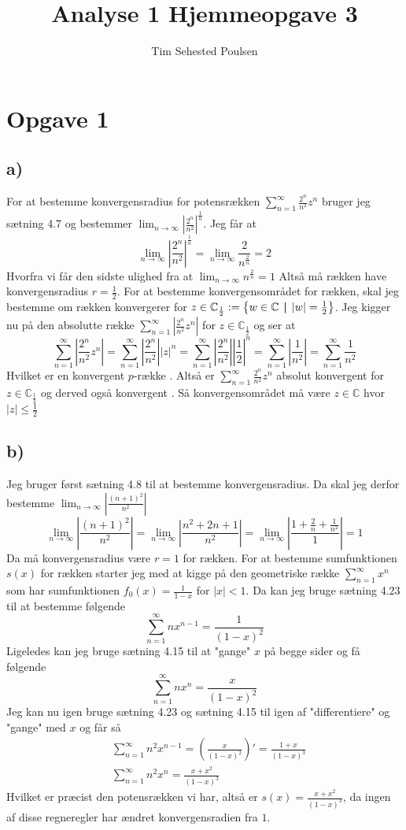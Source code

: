 \documentclass{article}
\title{Analyse 1 Hjemmeopgave 3}
\author{Tim Sehested Poulsen}
\newcommand{\m}[1]{\mathbb{#1}}
\newcommand{\mC}{\m{C}}
\newcommand{\lr}[1]{\left( #1\right)}
\newcommand{\set}[2]{\left\{ #1 \hspace{0.15cm} \textbf{\textbar}  \hspace{0.15cm} #2 \right\} }
\begin{document}
\section*{Opgave 1}
\subsection*{a)}
For at bestemme konvergensradius for potensrækken $\sum_{n=1}^{\infty} \frac{2^n}{n^2} z^n$ bruger jeg sætning 4.7 \cite{an1} og bestemmer
$\lim_{n \to \infty} |\frac{2^n}{n^2}|^{\frac{1}{n}}$. Jeg får at
\[
    \lim_{n \to \infty} |\frac{2^n}{n^2}|^{\frac{1}{n}}
    = \lim_{n \to \infty} \frac{2}{n^{\frac{2}{n}}}
    = 2
\]
Hvorfra vi får den sidste ulighed fra at $\lim_{n \to \infty} n^{\frac{2}{n}} = 1$ \cite[Eks. 1.46]{an1}
Altså må rækken have konvergensradius $r=\frac{1}{2}$.
For at bestemme konvergensområdet for rækken, skal jeg bestemme om rækken konvergerer for $z \in \mC_{\frac{1}{2}} := \set{w \in \mC}{|w|=\frac{1}{2}}$.
Jeg kigger nu på den absolutte række $\sum_{n=1}^{\infty} | \frac{2^n}{n^2} z^n|$ for $z \in \mC_{\frac{1}{2}}$ og ser at
\[
    \sum_{n=1}^{\infty} | \frac{2^n}{n^2} z^n|
    = \sum_{n=1}^{\infty} | \frac{2^n}{n^2}| |z|^n
    = \sum_{n=1}^{\infty} | \frac{2^n}{n^2}| |\frac{1}{2}|^n
    = \sum_{n=1}^{\infty} | \frac{1}{n^2}|
    = \sum_{n=1}^{\infty} \frac{1}{n^2}
\]
Hvilket er en konvergent $p$-række \cite[Eks. 2.23]{an1}. 
Altså er $\sum_{n=1}^{\infty} \frac{2^n}{n^2} z^n$ absolut konvergent
for $z \in \mC_{\frac{1}{2}}$ og derved også konvergent \cite[2.36]{an1}.
Så konvergensområdet må være $z \in \mC$ hvor $|z| \le \frac{1}{2}$

\subsection*{b)}
Jeg bruger først sætning 4.8 \cite{an1} til at bestemme konvergensradius. Da skal
jeg derfor bestemme $\lim_{n \to \infty} |\frac{(n+1)^2}{n^2}|$
\[
    \lim_{n \to \infty} |\frac{(n+1)^2}{n^2}|
    = \lim_{n \to \infty} |\frac{n^2 +2n + 1}{n^2}|
    = \lim_{n \to \infty} |\frac{1 +\frac{2}{n} + \frac{1}{n^2}}{1}|
    = 1 
\]
Da må konvergensradius være $r=1$ for rækken. For at bestemme sumfunktionen $s(x)$ for rækken
starter jeg med at kigge på den geometriske række $\sum_{n=1}^{\infty} x^n$  
som har sumfunktionen $f_0(x) = \frac{1}{1-x}$ for $|x| < 1$.
Da kan jeg bruge sætning 4.23 \cite{an1} til at bestemme følgende 
\[
    \sum_{n=1}^{\infty} n x^{n-1} = \frac{1}{(1-x)^2}
\]
Ligeledes kan jeg bruge sætning 4.15 \cite{an1} til at "gange" $x$ på begge sider
og få følgende
\[
    \sum_{n=1}^{\infty} n x^{n} = \frac{x}{(1-x)^2}
\]
Jeg kan nu igen bruge sætning 4.23 og sætning 4.15 \cite{an1} til igen af "differentiere" og "gange" med $x$ og får så
\begin{align*}
    &\sum_{n=1}^{\infty} n^2 x^{n-1} = \lr{\frac{x}{(1-x)^2}}' = \frac{1+x}{(1-x)^3} \\
    &\sum_{n=1}^{\infty} n^2 x^{n} = \frac{x+x^2}{(1-x)^3}
\end{align*}
Hvilket er præcist den potensrækken vi har, altså er $s(x) = \frac{x+x^2}{(1-x)^3}$,
da ingen af disse regneregler har ændret konvergensradien fra $1$.
\end{document}
